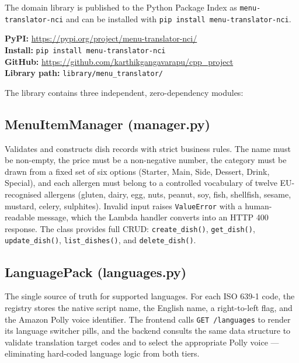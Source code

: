 \documentclass[conference]{IEEEtran}
\begin{document}
The domain library is published to the Python Package Index as \texttt{menu-translator-nci} and can be installed with \texttt{pip install menu-translator-nci}.

\begin{tcolorbox}[
    colback=blue!3,
    colframe=blue!40!black,
    title=\textbf{Library Links},
    fonttitle=\small,
    fontupper=\footnotesize,
    left=4pt, right=4pt, top=3pt, bottom=3pt,
    arc=2pt
]
\textbf{PyPI:} \url{https://pypi.org/project/menu-translator-nci/} \\
\textbf{Install:} \texttt{pip install menu-translator-nci} \\
\textbf{GitHub:} \url{https://github.com/karthikgangavarapu/cpp_project} \\
\textbf{Library path:} \texttt{library/menu\_translator/}
\end{tcolorbox}

The library contains three independent, zero-dependency modules:

\subsection{MenuItemManager (manager.py)}

Validates and constructs dish records with strict business rules. The name must be non-empty, the price must be a non-negative number, the category must be drawn from a fixed set of six options (Starter, Main, Side, Dessert, Drink, Special), and each allergen must belong to a controlled vocabulary of twelve EU-recognised allergens (gluten, dairy, egg, nuts, peanut, soy, fish, shellfish, sesame, mustard, celery, sulphites). Invalid input raises \texttt{ValueError} with a human-readable message, which the Lambda handler converts into an HTTP 400 response. The class provides full CRUD: \texttt{create\_dish()}, \texttt{get\_dish()}, \texttt{update\_dish()}, \texttt{list\_dishes()}, and \texttt{delete\_dish()}.

\subsection{LanguagePack (languages.py)}

The single source of truth for supported languages. For each ISO 639-1 code, the registry stores the native script name, the English name, a right-to-left flag, and the Amazon Polly voice identifier. The frontend calls \texttt{GET /languages} to render its language switcher pills, and the backend consults the same data structure to validate translation target codes and to select the appropriate Polly voice --- eliminating hard-coded language logic from both tiers.
\end{document}
